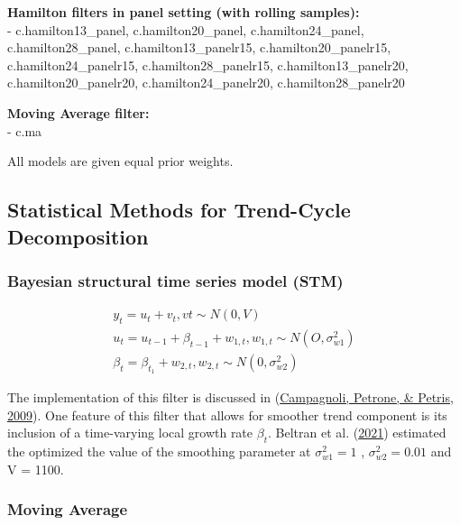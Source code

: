 \documentclass[
  12pt,
]{article}
\begin{document}
\textbf{Hamilton filters in panel setting (with rolling samples):\\
}- c.hamilton13\_panel, c.hamilton20\_panel, c.hamilton24\_panel, c.hamilton28\_panel, c.hamilton13\_panelr15, c.hamilton20\_panelr15, c.hamilton24\_panelr15, c.hamilton28\_panelr15, c.hamilton13\_panelr20, c.hamilton20\_panelr20, c.hamilton24\_panelr20, c.hamilton28\_panelr20

\textbf{Moving Average filter:\\
}- c.ma

All models are given equal prior weights.

\hypertarget{ma-stm-eq}{%
\subsection{Statistical Methods for Trend-Cycle Decomposition}\label{ma-stm-eq}}

\hypertarget{bayesian-structural-time-series-model-stm}{%
\subsubsection*{Bayesian structural time series model (STM)}\label{bayesian-structural-time-series-model-stm}}

\begin{align*}
y_t = u_t + v_t,  vt \sim N(0,V)\\
u_t = u_{t-1} + \beta_{t-1} + w_{1,t},  w_{1,t} \sim N(O,\sigma^2_{w1})\\
\beta_t = \beta_{t_1} + w_{2,t},  w_{2,t} \sim N(0,\sigma^2_{w2})
\end{align*}

The implementation of this filter is discussed in (\protect\hyperlink{ref-campagnoli_dynamic_2009}{Campagnoli, Petrone, \& Petris, 2009}). One feature of this filter that allows for smoother trend component is its inclusion of a time-varying local growth rate \(\beta_t\). Beltran et al. (\protect\hyperlink{ref-beltran_optimizing_2021}{2021}) estimated the optimized the value of the smoothing parameter at \(\sigma^2_{w1} = 1\) , \(\sigma^2_{w2}=0.01\) and V = 1100.

\hypertarget{moving-average}{%
\subsubsection*{Moving Average}\label{moving-average}}
\end{document}
